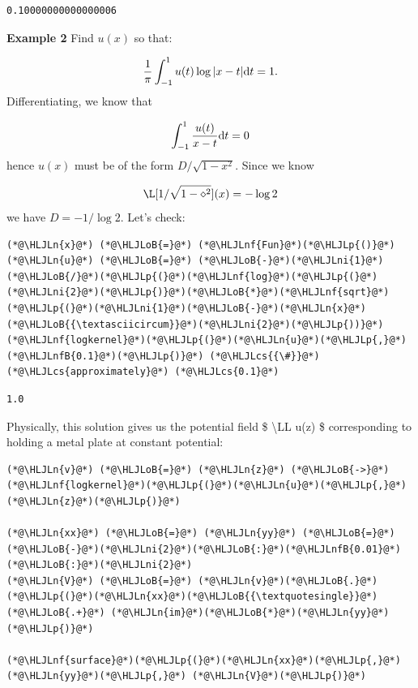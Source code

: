 \documentclass[12pt,a4paper]{article}
\newcommand{\HLJLn}[1]{#1}
\newcommand{\HLJLnf}[1]{\textcolor[RGB]{66,102,213}{#1}}
\newcommand{\HLJLnfB}[1]{\textcolor[RGB]{59,151,46}{#1}}
\newcommand{\HLJLni}[1]{\textcolor[RGB]{59,151,46}{#1}}
\newcommand{\HLJLoB}[1]{\textcolor[RGB]{102,102,102}{\textbf{#1}}}
\newcommand{\HLJLp}[1]{#1}
\newcommand{\HLJLcs}[1]{\textcolor[RGB]{153,153,119}{\textit{#1}}}
\def\D{ {\rm d} }
\def\dt{\D t}
\begin{document}
\begin{lstlisting}
0.10000000000000006
\end{lstlisting}


\textbf{Example 2} Find $u(x)$ so that: 

\[
{1 \over \pi} \int_{-1}^1 u(t) \log | x-t| \dt = 1.
\]
Differentiating, we know that 

\[
\int_{-1}^1 {u(t) \over x-t} \dt = 0
\]
hence $u(x)$ must be of the form ${D / \sqrt{1-x^2}}$.  Since we know 

\[
\L[{1 /\sqrt{1-\diamond^2}}](x) = - \log 2
\]
we have $D = -1/\log 2$. Let's check:


\begin{lstlisting}
(*@\HLJLn{x}@*) (*@\HLJLoB{=}@*) (*@\HLJLnf{Fun}@*)(*@\HLJLp{()}@*)
(*@\HLJLn{u}@*) (*@\HLJLoB{=}@*) (*@\HLJLoB{-}@*)(*@\HLJLni{1}@*)(*@\HLJLoB{/}@*)(*@\HLJLp{(}@*)(*@\HLJLnf{log}@*)(*@\HLJLp{(}@*)(*@\HLJLni{2}@*)(*@\HLJLp{)}@*)(*@\HLJLoB{*}@*)(*@\HLJLnf{sqrt}@*)(*@\HLJLp{(}@*)(*@\HLJLni{1}@*)(*@\HLJLoB{-}@*)(*@\HLJLn{x}@*)(*@\HLJLoB{{\textasciicircum}}@*)(*@\HLJLni{2}@*)(*@\HLJLp{))}@*)
(*@\HLJLnf{logkernel}@*)(*@\HLJLp{(}@*)(*@\HLJLn{u}@*)(*@\HLJLp{,}@*) (*@\HLJLnfB{0.1}@*)(*@\HLJLp{)}@*) (*@\HLJLcs{{\#}}@*) (*@\HLJLcs{approximately}@*) (*@\HLJLcs{0.1}@*)
\end{lstlisting}

\begin{lstlisting}
1.0
\end{lstlisting}


Physically, this solution gives us the potential field  \$ {\textbackslash}LL u(z) \$ corresponding to holding a metal plate at constant potential:


\begin{lstlisting}
(*@\HLJLn{v}@*) (*@\HLJLoB{=}@*) (*@\HLJLn{z}@*) (*@\HLJLoB{->}@*) (*@\HLJLnf{logkernel}@*)(*@\HLJLp{(}@*)(*@\HLJLn{u}@*)(*@\HLJLp{,}@*) (*@\HLJLn{z}@*)(*@\HLJLp{)}@*)

(*@\HLJLn{xx}@*) (*@\HLJLoB{=}@*) (*@\HLJLn{yy}@*) (*@\HLJLoB{=}@*) (*@\HLJLoB{-}@*)(*@\HLJLni{2}@*)(*@\HLJLoB{:}@*)(*@\HLJLnfB{0.01}@*)(*@\HLJLoB{:}@*)(*@\HLJLni{2}@*)
(*@\HLJLn{V}@*) (*@\HLJLoB{=}@*) (*@\HLJLn{v}@*)(*@\HLJLoB{.}@*)(*@\HLJLp{(}@*)(*@\HLJLn{xx}@*)(*@\HLJLoB{{\textquotesingle}}@*) (*@\HLJLoB{.+}@*) (*@\HLJLn{im}@*)(*@\HLJLoB{*}@*)(*@\HLJLn{yy}@*)(*@\HLJLp{)}@*)

(*@\HLJLnf{surface}@*)(*@\HLJLp{(}@*)(*@\HLJLn{xx}@*)(*@\HLJLp{,}@*) (*@\HLJLn{yy}@*)(*@\HLJLp{,}@*) (*@\HLJLn{V}@*)(*@\HLJLp{)}@*)
\end{lstlisting}
\end{document}
